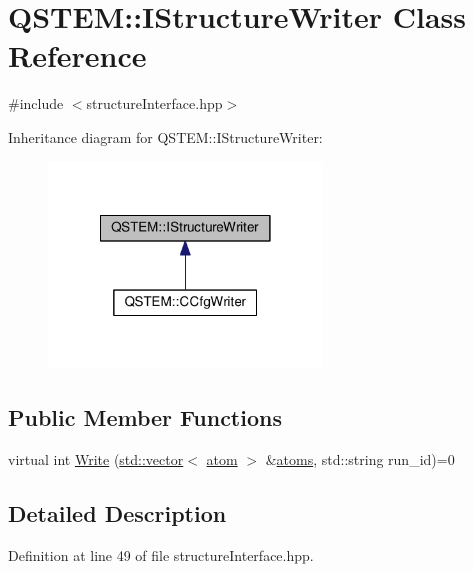 \hypertarget{class_q_s_t_e_m_1_1_i_structure_writer}{\section{Q\-S\-T\-E\-M\-:\-:I\-Structure\-Writer Class Reference}
\label{class_q_s_t_e_m_1_1_i_structure_writer}
}


{\ttfamily \#include $<$structure\-Interface.\-hpp$>$}



Inheritance diagram for Q\-S\-T\-E\-M\-:\-:I\-Structure\-Writer\-:
\nopagebreak
\begin{figure}[H]
\begin{center}
\leavevmode
\includegraphics[width=206pt]{class_q_s_t_e_m_1_1_i_structure_writer__inherit__graph}
\end{center}
\end{figure}
\subsection*{Public Member Functions}
\begin{DoxyCompactItemize}
\item 
virtual int \hyperlink{class_q_s_t_e_m_1_1_i_structure_writer_aaa5072deb1a278546bf834f1a6ad63c7}{Write} (\hyperlink{qmb_8m_af54b69a32590de218622e869b06b47b3}{std\-::vector}$<$ \hyperlink{namespace_q_s_t_e_m_a402dabc31a7a1fe906d0cdd138c69686}{atom} $>$ \&\hyperlink{qmb_8m_a7c5cd0264da47e230ba8c984690fe16c}{atoms}, std\-::string run\-\_\-id)=0
\end{DoxyCompactItemize}


\subsection{Detailed Description}


Definition at line 49 of file structure\-Interface.\-hpp.



